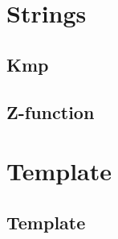 \documentclass{article}
\newcommand\includes[2]{ %
   \subsection{#1}
   
}
\begin{document}
\begin{multicols}{2}
\section{Strings}
\includes{Kmp}{Materiais/Strings/kmp.cpp}
\includes{Z-function}{Materiais/Strings/z-function.cpp}
\section{Template}
\includes{Template}{Materiais/Template/template.cpp}

\end{multicols}
\end{document}
